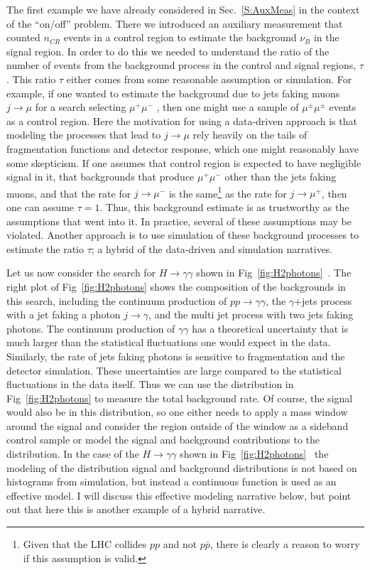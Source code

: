 \documentclass{cernrep}
\begin{document}
The first example we have already considered in Sec.~\ref{S:AuxMeas} in the context of the ``on/off'' problem.  There we introduced an auxiliary measurement that counted $n_{CR}$ events in a  control region to estimate the background $\nu_B$ in the signal region.  In order to do this we needed to understand the ratio of the number of events from the background process in the control and signal regions, $\tau$.  This ratio $\tau$ either comes from some reasonable assumption or simulation.  For example, if one wanted to estimate the background due to jets faking muons $j\to\mu$ for a search selecting $\mu^+\mu^-$ , then one might use a sample of $\mu^\pm\mu^\pm$ events as a control region.  Here the motivation for using a data-driven approach  is that modeling the processes that lead to $j\to\mu$ rely heavily on the tails of fragmentation functions and detector response, which one might reasonably have some skepticism.  If one assumes that control region is expected to have negligible signal in it, that backgrounds that produce $\mu^+\mu^-$ other than the jets faking muons, and that the rate for $j\to\mu^-$ is the same\footnote{Given that the LHC collides $pp$ and not $p\bar{p}$, there is clearly a reason to worry if this assumption is valid.} as the rate for $j\to\mu^+$, then one can assume $\tau=1$.  Thus, this background estimate is as trustworthy as the assumptions that went into it.    In practice, several of these assumptions may be violated.  Another approach is to use simulation of these background processes to estimate the ratio $\tau$; a hybrid of the data-driven and simulation narratives.

Let us now consider the search for $H\to\gamma\gamma$ shown in Fig~\ref{fig:H2photons}~\cite{ATLAS-CONF-2011-161,ATLAS:2012ad}.  The right plot of  Fig~\ref{fig:H2photons} shows the composition of the backgrounds in this search, including the continuum production of $pp\to\gamma\gamma$, the $\gamma$+jets process with a jet faking a photon $j\to\gamma$, and the multi jet process with two jets faking photons.  The continuum production of $\gamma\gamma$ has a  theoretical uncertainty that is much larger than the statistical fluctuations one would expect in the data.  Similarly, the rate of jets faking photons is sensitive to fragmentation and the detector simulation.  These uncertainties are large compared to the statistical fluctuations in the data itself.  Thus we can use the distribution in  Fig~\ref{fig:H2photons} to measure the total background rate.  Of course, the signal would also be in this distribution, so one either needs to apply a mass window around the signal and consider the region outside of the window as a sideband control sample or model the signal and background contributions to the distribution.  In the case of the   $H\to\gamma\gamma$ shown in Fig~\ref{fig:H2photons}~\cite{ATLAS-CONF-2011-161,ATLAS:2012ad} the modeling of the distribution signal and background distributions is not based on histograms from simulation, but instead a continuous function is used as an effective model.  I will discuss this effective modeling narrative below, but point out that here this is another example of a hybrid narrative.
\end{document}
